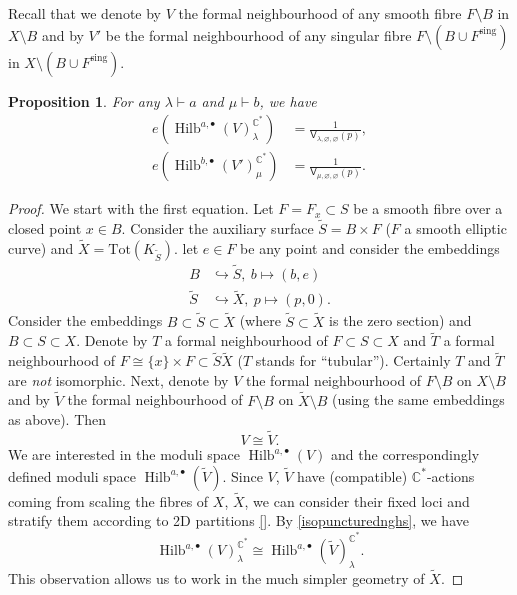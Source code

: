 \documentclass{amsart}
\newtheorem{proposition}[theorem]{Proposition}
\theoremstyle{definition}
\newcommand{\CC} {\mathbb{C}}          %
\newcommand{\sfV}{\mathsf{V}}
\newcommand{\Hilb}{\operatorname{Hilb}}
\newcommand{\sing}{\operatorname{sing}}
\begin{document}
Recall that we denote by $V$ the formal neighbourhood of any smooth fibre $F \setminus B$ in $X \setminus B$ and by $V'$ be the formal neighbourhood of any singular fibre $F \setminus (B \cup F^{\sing})$ in $X \setminus (B \cup F^{\sing})$. 
\begin{proposition}
For any $\lambda \vdash a$ and $\mu \vdash b$, we have
\begin{align*}
e(\Hilb^{a,\bullet}(V)_{\lambda}^{\CC^*}) &= \frac{1}{\sfV_{\lambda,\varnothing,\varnothing}(p)}, \\
e(\Hilb^{b,\bullet}(V')_{\mu}^{\CC^*}) &= \frac{1}{\sfV_{\mu,\varnothing,\varnothing}(p)}.
\end{align*}
\end{proposition}
\begin{proof}
We start with the first equation. Let $F = F_x \subset S$ be a smooth fibre over a closed point $x \in B$. Consider the auxiliary surface $\tilde{S} = B \times F$ ($F$ a smooth elliptic curve) and $\tilde{X} = \mathrm{Tot}(K_{\tilde{S}})$. let $e \in F$ be any point and consider the embeddings 
\begin{align*}
B &\hookrightarrow \tilde{S}, \ b \mapsto (b,e) \\
\tilde{S} &\hookrightarrow \tilde{X}, \ p \mapsto (p,0).
\end{align*}
Consider the embeddings $B \subset \tilde{S} \subset \tilde{X}$ (where $\tilde{S} \subset \tilde{X}$ is the zero section) and $B \subset S \subset X$. Denote by $T$ a formal neighbourhood of $F \subset S \subset X$ and $\tilde{T}$ a formal neighbourhood of $F \cong \{x\} \times F \subset \tilde{S} \tilde{X}$ ($T$ stands for ``tubular''). Certainly $T$ and $\tilde{T}$ are \emph{not} isomorphic. Next, denote by $V$ the formal neighbourhood of $F \setminus B$ on $X \setminus B$ and by $\tilde{V}$ the formal neighbourhood of $F \setminus B$ on $\tilde{X} \setminus B$ (using the same embeddings as above). Then 
\begin{equation} \label{isopuncturednghs}
V \cong \tilde{V}.
\end{equation}
We are interested in the moduli space $\Hilb^{a,\bullet}(V)$ and the correspondingly defined moduli space $\Hilb^{a,\bullet}(\tilde{V})$. Since $V$, $\tilde{V}$ have (compatible) $\CC^*$-actions coming from scaling the fibres of $X$, $\tilde{X}$, we can consider their fixed loci and stratify them according to 2D partitions \ref{}. By \eqref{isopuncturednghs}, we have    
$$
\Hilb^{a,\bullet}(V)_{\lambda}^{\CC^*} \cong \Hilb^{a,\bullet}(\tilde{V})_{\lambda}^{\CC^*}.
$$
This observation allows us to work in the much simpler geometry of $\tilde{X}$.


\end{proof}
\end{document}

